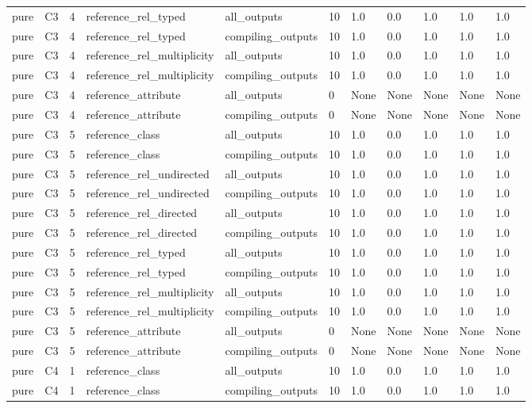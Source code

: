 \begin{tabular}{lllllllllll}
pure & C3 & 4 & reference\_rel\_typed & all\_outputs & 10 & 1.0 & 0.0 & 1.0 & 1.0 & 1.0 \\
pure & C3 & 4 & reference\_rel\_typed & compiling\_outputs & 10 & 1.0 & 0.0 & 1.0 & 1.0 & 1.0 \\
pure & C3 & 4 & reference\_rel\_multiplicity & all\_outputs & 10 & 1.0 & 0.0 & 1.0 & 1.0 & 1.0 \\
pure & C3 & 4 & reference\_rel\_multiplicity & compiling\_outputs & 10 & 1.0 & 0.0 & 1.0 & 1.0 & 1.0 \\
pure & C3 & 4 & reference\_attribute & all\_outputs & 0 & None & None & None & None & None \\
pure & C3 & 4 & reference\_attribute & compiling\_outputs & 0 & None & None & None & None & None \\
pure & C3 & 5 & reference\_class & all\_outputs & 10 & 1.0 & 0.0 & 1.0 & 1.0 & 1.0 \\
pure & C3 & 5 & reference\_class & compiling\_outputs & 10 & 1.0 & 0.0 & 1.0 & 1.0 & 1.0 \\
pure & C3 & 5 & reference\_rel\_undirected & all\_outputs & 10 & 1.0 & 0.0 & 1.0 & 1.0 & 1.0 \\
pure & C3 & 5 & reference\_rel\_undirected & compiling\_outputs & 10 & 1.0 & 0.0 & 1.0 & 1.0 & 1.0 \\
pure & C3 & 5 & reference\_rel\_directed & all\_outputs & 10 & 1.0 & 0.0 & 1.0 & 1.0 & 1.0 \\
pure & C3 & 5 & reference\_rel\_directed & compiling\_outputs & 10 & 1.0 & 0.0 & 1.0 & 1.0 & 1.0 \\
pure & C3 & 5 & reference\_rel\_typed & all\_outputs & 10 & 1.0 & 0.0 & 1.0 & 1.0 & 1.0 \\
pure & C3 & 5 & reference\_rel\_typed & compiling\_outputs & 10 & 1.0 & 0.0 & 1.0 & 1.0 & 1.0 \\
pure & C3 & 5 & reference\_rel\_multiplicity & all\_outputs & 10 & 1.0 & 0.0 & 1.0 & 1.0 & 1.0 \\
pure & C3 & 5 & reference\_rel\_multiplicity & compiling\_outputs & 10 & 1.0 & 0.0 & 1.0 & 1.0 & 1.0 \\
pure & C3 & 5 & reference\_attribute & all\_outputs & 0 & None & None & None & None & None \\
pure & C3 & 5 & reference\_attribute & compiling\_outputs & 0 & None & None & None & None & None \\
pure & C4 & 1 & reference\_class & all\_outputs & 10 & 1.0 & 0.0 & 1.0 & 1.0 & 1.0 \\
pure & C4 & 1 & reference\_class & compiling\_outputs & 10 & 1.0 & 0.0 & 1.0 & 1.0 & 1.0 \\

\end{tabular}
